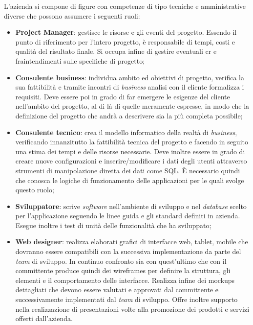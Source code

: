 L'azienda si compone di figure con competenze di tipo tecniche e amministrative diverse che possono assumere i seguenti ruoli:
\begin{itemize}
	\item\textbf{Project Manager}: gestisce le risorse e gli eventi del progetto. Essendo il punto di riferimento per l'intero progetto, è responsabile di tempi, costi e qualità del risultato finale. Si occupa infine di gestire eventuali \acrshort{cr} e fraintendimenti sulle specifiche di progetto;
	\item\textbf{Consulente business}: individua ambito ed obiettivi di progetto, verifica la sua fattibilità e tramite incontri di \textit{business} analisi con il cliente formalizza i requisiti. Deve essere poi in grado di far emergere le esigenze del cliente nell'ambito del progetto, al di là di quelle meramente espresse, in modo che la definizione del progetto che andrà a descrivere sia la più completa possibile;
	\item\textbf{Consulente tecnico}: crea il modello informatico della realtà di \textit{business}, verificando innanzitutto la fattibilità tecnica del progetto e facendo in seguito una stima dei tempi e delle risorse necessarie. Deve inoltre essere in grado di creare nuove configurazioni e inserire/modificare i dati degli utenti attraverso strumenti di manipolazione diretta dei dati come SQL. È necessario quindi che conosca le logiche di funzionamento delle applicazioni per le quali svolge questo ruolo;
	\item\textbf{Sviluppatore}: scrive \textit{software} nell'ambiente di sviluppo e nel \textit{database} scelto per l'applicazione seguendo le linee guida e gli standard definiti in azienda. Esegue inoltre i test di unità delle funzionalità che ha sviluppato;
	\item\textbf{Web designer}: realizza elaborati grafici di interfacce web, tablet, mobile che dovranno essere compatibili con la successiva implementazione da parte del \textit{team} di sviluppo. In continuo confronto sia con quest'ultimo che con il committente produce quindi dei \glspl{wireframe} per definire la struttura, gli elementi e il comportamento delle interfacce. Realizza infine dei \glspl{mockup} dettagliati che devono essere valutati e approvati dal committente e successivamente implementati dal \textit{team} di sviluppo. Offre inoltre supporto nella realizzazione di presentazioni volte alla promozione dei prodotti e servizi offerti dall'azienda.
\end{itemize}

